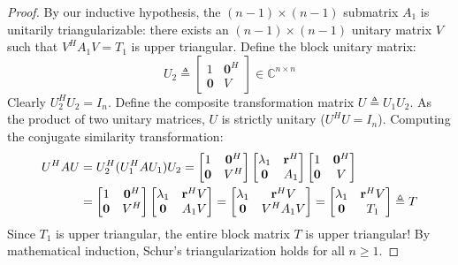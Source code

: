\begin{proof}
By our inductive hypothesis, the $(n-1) \times (n-1)$ submatrix $A_1$ is unitarily triangularizable: there exists an $(n-1) \times (n-1)$ unitary matrix $V$ such that $V^H A_1 V = T_1$ is upper triangular. Define the block unitary matrix:
\begin{equation}
U_2 \triangleq \begin{bmatrix} 1 & \mathbf{0}^H \\ \mathbf{0} & V \end{bmatrix} \in \mathbb{C}^{n \times n}
\end{equation}
Clearly $U_2^H U_2 = I_n$. Define the composite transformation matrix $U \triangleq U_1 U_2$. As the product of two unitary matrices, $U$ is strictly unitary ($U^H U = I_n$). Computing the conjugate similarity transformation:
\begin{align}
U^H A U &= U_2^H (U_1^H A U_1) U_2 = \begin{bmatrix} 1 & \mathbf{0}^H \\ \mathbf{0} & V^H \end{bmatrix} \begin{bmatrix} \lambda_1 & \mathbf{r}^H \\ \mathbf{0} & A_1 \end{bmatrix} \begin{bmatrix} 1 & \mathbf{0}^H \\ \mathbf{0} & V \end{bmatrix} \notag \\
&= \begin{bmatrix} 1 & \mathbf{0}^H \\ \mathbf{0} & V^H \end{bmatrix} \begin{bmatrix} \lambda_1 & \mathbf{r}^H V \\ \mathbf{0} & A_1 V \end{bmatrix} = \begin{bmatrix} \lambda_1 & \mathbf{r}^H V \\ \mathbf{0} & V^H A_1 V \end{bmatrix} = \begin{bmatrix} \lambda_1 & \mathbf{r}^H V \\ \mathbf{0} & T_1 \end{bmatrix} \triangleq T
\end{align}
Since $T_1$ is upper triangular, the entire block matrix $T$ is upper triangular! By mathematical induction, Schur's triangularization holds for all $n \ge 1$.
\end{proof}

